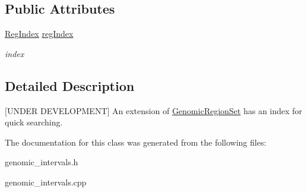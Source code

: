 \subsection*{Public Attributes}
\begin{CompactItemize}
\item 
\hypertarget{classIndexedGenomicRegionSet_594ca1013c6d77da12dfb9b626781f71}{
\hyperlink{classIndexedGenomicRegionSet_c1e7aa6c1a55659c5756a70d0289c997}{RegIndex} \hyperlink{classIndexedGenomicRegionSet_594ca1013c6d77da12dfb9b626781f71}{regIndex}}
\label{classIndexedGenomicRegionSet_594ca1013c6d77da12dfb9b626781f71}

\begin{CompactList}\small\item\em index \item\end{CompactList}\end{CompactItemize}


\subsection{Detailed Description}
\mbox{[}UNDER DEVELOPMENT\mbox{]} An extension of \hyperlink{classGenomicRegionSet}{GenomicRegionSet} has an index for quick searching. 

The documentation for this class was generated from the following files:\begin{CompactItemize}
\item 
genomic\_\-intervals.h\item 
genomic\_\-intervals.cpp\end{CompactItemize}

